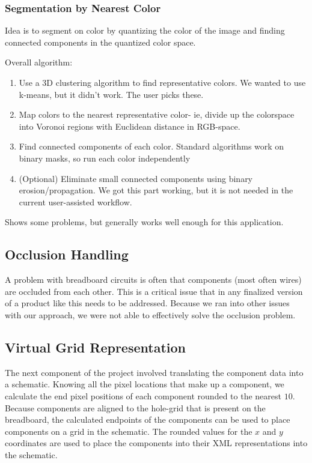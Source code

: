 \documentclass[10pt,twocolumn,letterpaper]{article}
\begin{document}
\subsubsection{Segmentation by Nearest Color}

Idea is to segment on color by quantizing the color of the
image and finding connected components in the quantized color space.

Overall algorithm:
\begin{enumerate}
\item Use a 3D clustering algorithm to find representative colors. We
  wanted to use k-means, but it didn't work. The user picks these.
\item Map colors to the nearest representative color- ie, divide up
  the colorspace into Voronoi regions with Euclidean distance in
  RGB-space.
\item Find connected components of each color. Standard algorithms
  work on binary masks, so run each color independently
\item (Optional) Eliminate small connected components using binary
  erosion/propagation. We got this part working, but it is not needed
  in the current user-assisted workflow.
\end{enumerate}

Shows some problems, but generally works well enough for this application.

\subsection{Occlusion Handling}

A problem with breadboard circuits is often that components (most often wires)
are occluded from each other. This is a critical issue that in any finalized
version of a product like this needs to be addressed. Because we ran into other
issues with our approach, we were not able to effectively solve the occlusion
problem.  

\subsection{Virtual Grid Representation}

The next component of the project involved translating the component data into
a schematic. Knowing all the pixel locations that make up a component, we
calculate the end pixel positions of each component rounded to the nearest
$10$. Because components are aligned to the hole-grid that is present on the
breadboard, the calculated endpoints of the components can be used to place
components on a grid in the schematic. The rounded values for the $x$ and $y$
coordinates are used to place the components into their XML representations
into the schematic. 
\end{document}
